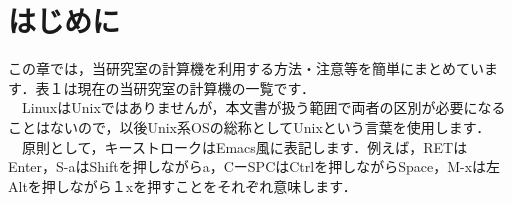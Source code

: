 \documentclass[main]{subfiles}
\begin{document}
\chapter{はじめに}
\fontsize{10}{10} \selectfont
この章では，当研究室の計算機を利用する方法・注意等を簡単にまとめています．表１は現在の当研究室の計算機の一覧です．\\
　LinuxはUnixではありませんが，本文書が扱う範囲で両者の区別が必要になることはないので，以後Unix系OSの総称としてUnixという言葉を使用します．\\
　原則として，キーストロークはEmacs風に表記します．例えば，RETはEnter，S-aはShiftを押しながらa，CーSPCはCtrlを押しながらSpace，M-xは左Altを押しながら１xを押すことをそれぞれ意味します．
\end{document}
